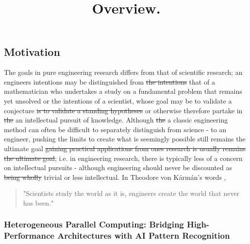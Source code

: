\documentclass[10pt]{article}[draft]
\begin{document}
	
\title{Overview.}
\tableofcontents
\date{}
\maketitle


\begin{center}
\section{Motivation}
\end{center}
The goals in pure engineering research differs from that of scientific research; an engineers intentions may be distinguished from \st{the intentions} that of a mathematician who undertakes a study on a fundamental problem that remains yet unsolved or the intentions of a scientist, whose goal may be to validate a conjecture \st{is to validate a standing hypotheses} or otherwise therefore partake in \st{the} an intellectual pursuit of knowledge. Although \st{the} a classic engineering method can often be difficult to separately distinguish from science - to an engineer, pushing the limits to create what is seemingly possible still remains the ultimate goal \st{gaining practical applications from ones research {is} usually remains the ultimate goal}\cite{vincenti1990}; i.e. in engineering research, there is typically less of a concern on intellectual pursuits - although engineering should never be discounted as \st{being wholly} trivial or less intellectual. In Theodore von Kármán's words \cite{vonKarman1967},\\
\begin{quote}
	"Scientists study the world as it is, engineers create the world that never has been."
\end{quote}

\subsubsection*{Heterogeneous Parallel Computing: Bridging High-Performance Architectures with AI Pattern Recognition}
\end{document}
